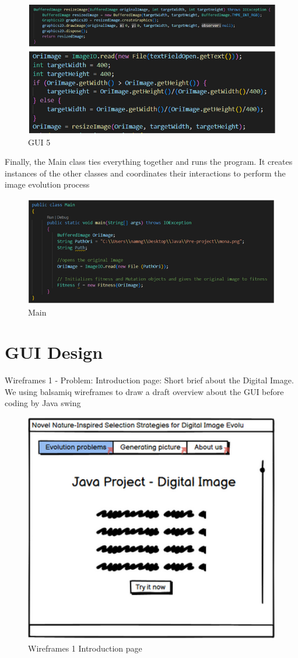 \begin{figure}
\centering
\includegraphics[width=4.5in]{images/gui5.png}

\caption{GUI 5}
\end{figure}
Finally, the Main class ties everything together and runs the program. It creates instances of the other classes and coordinates their interactions to perform the image evolution process
\begin{figure}
\centering
\includegraphics[width=4.5in]{images/main.png}

\caption{Main}
\end{figure}


\section{GUI Design}\label{GUI Design}
Wireframes 1 - Problem: Introduction page: Short brief about the Digital Image. We using balsamiq wireframes to draw a draft overview about the GUI before coding by Java swing
\begin{figure}
\centering
\includegraphics[width=4.5in]{images/wf1.png}
\caption{Wireframes 1 Introduction page}
\end{figure}
\newpage

